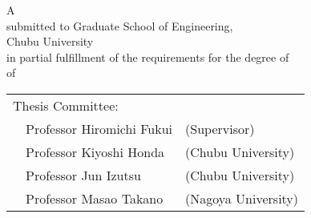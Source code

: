 \renewcommand\thepage{Title2}
\thispagestyle{empty}
\vspace*{8.9truecm}
\begin{center}
 A \edoctitle \\
 submitted to Graduate School of Engineering, \\
 Chubu University \\
 in partial fulfillment of the requirements for the degree of \\
 {\degree} of \major \\
 \bigskip

 \eauthor

 \vspace*{4.8truemm}

 \centering
 \begin{tabular}[t]{p{}ll}
  \multicolumn{2}{l}{Thesis Committee:} \\
  & Professor Hiromichi Fukui & (Supervisor) \\
  & Professor Kiyoshi Honda & (Chubu University) \\
  & Professor Jun Izutsu & (Chubu University) \\
  & Professor Masao Takano & (Nagoya University)
 \end{tabular}
\end{center}